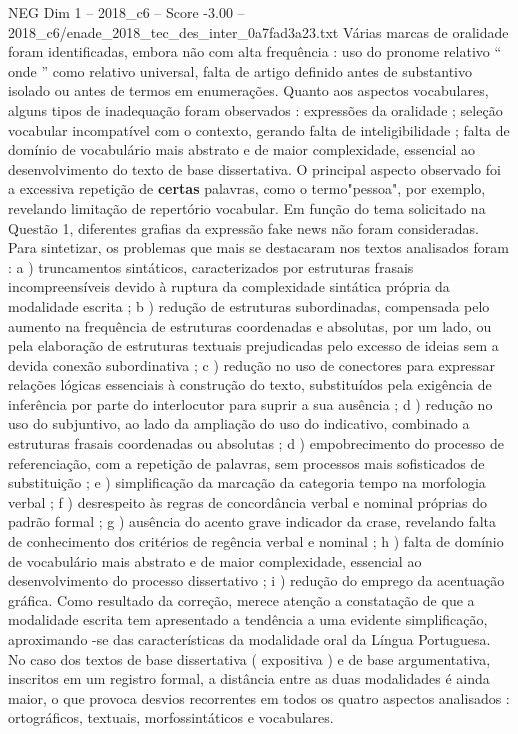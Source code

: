 \begin{textsample}{NEG Dim 1 – 2018\_c6 – Score -3.00 – 2018\_c6/enade\_2018\_tec\_des\_inter\_0a7fad3a23.txt}
Várias marcas de oralidade foram identificadas, embora não com alta frequência : uso do pronome relativo “ onde ” como relativo universal, falta de artigo definido antes de substantivo isolado ou antes de termos em enumerações.
Quanto aos aspectos vocabulares, alguns tipos de inadequação foram observados : expressões da oralidade ; seleção vocabular incompatível com o contexto, gerando falta de inteligibilidade ; falta de domínio de vocabulário mais abstrato e de maior complexidade, essencial ao desenvolvimento do texto de base dissertativa.
O principal aspecto observado foi a excessiva repetição de \textbf{certas} palavras, como o termo"pessoa", por exemplo, revelando limitação de repertório vocabular.
Em função do tema solicitado na Questão 1, diferentes grafias da expressão fake news não foram consideradas.
Para sintetizar, os problemas que mais se destacaram nos textos analisados foram : a ) truncamentos sintáticos, caracterizados por estruturas frasais incompreensíveis devido à ruptura da complexidade sintática própria da modalidade escrita ; b ) redução de estruturas subordinadas, compensada pelo aumento na frequência de estruturas coordenadas e absolutas, por um lado, ou pela elaboração de estruturas textuais prejudicadas pelo excesso de ideias sem a devida conexão subordinativa ; c ) redução no uso de conectores para expressar relações lógicas essenciais à construção do texto, substituídos pela exigência de inferência por parte do interlocutor para suprir a sua ausência ; d ) redução no uso do subjuntivo, ao lado da ampliação do uso do indicativo, combinado a estruturas frasais coordenadas ou absolutas ; d ) empobrecimento do processo de referenciação, com a repetição de palavras, sem processos mais sofisticados de substituição ; e ) simplificação da marcação da categoria tempo na morfologia verbal ; f ) desrespeito às regras de concordância verbal e nominal próprias do padrão formal ; g ) ausência do acento grave indicador da crase, revelando falta de conhecimento dos critérios de regência verbal e nominal ; h ) falta de domínio de vocabulário mais abstrato e de maior complexidade, essencial ao desenvolvimento do processo dissertativo ; i ) redução do emprego da acentuação gráfica.
Como resultado da correção, merece atenção a constatação de que a modalidade escrita tem apresentado a tendência a uma evidente simplificação, aproximando -se das características da modalidade oral da Língua Portuguesa.
No caso dos textos de base dissertativa ( expositiva ) e de base argumentativa, inscritos em um registro formal, a distância entre as duas modalidades é ainda maior, o que provoca desvios recorrentes em todos os quatro aspectos analisados : ortográficos, textuais, morfossintáticos e vocabulares.

\end{textsample}
